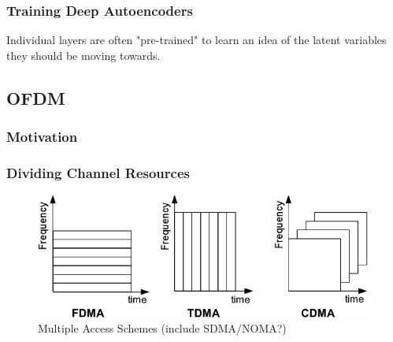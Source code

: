 \documentclass{beamer}
\begin{document}
\begin{frame}
	\frametitle{Training Deep Autoencoders}
	Individual layers are often "pre-trained" to learn an
	idea of the latent variables they should be moving towards.
	\cite[14.3][]{goodfellow2016deep}
\end{frame}

\subsection{OFDM}

\subsubsection{Motivation}



\begin{frame}
	\frametitle{Dividing Channel Resources}
	\begin{figure}
	\includegraphics[scale=1]{Images/Output/FDMA-TDMA-CDMA-Frequency-Time-division.png}
		\caption{Multiple Access Schemes (include SDMA/NOMA?)}
	\end{figure}
\end{frame}
\end{document}
